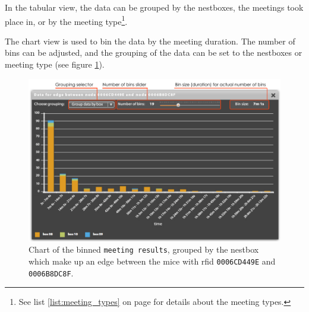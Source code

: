 In the tabular view, the data can be grouped by the nestboxes, the meetings took place in, or by the meeting type\footnote{See list \ref{list:meeting_types} on page \pageref{list:meeting_types} for details about the meeting types.}.

The chart view is used to bin the data by the meeting duration. The number of bins can be adjusted, and the grouping of the data can be set to the nestboxes or meeting type (see figure \ref{fig:edge_data_panel_chart}).

\begin{figure}[!htpb]
\begin{center}
  \includegraphics[width=\textwidth]{assets/pdf/edge_data_panel_chart.pdf}
  \caption[Edge data chart]{Chart of the binned \lstinline|meeting results|, grouped by the nestbox which make up an edge between the mice with rfid \lstinline|0006CD449E| and \lstinline|0006B8DC8F|.}
  \label{fig:edge_data_panel_chart}
\end{center}
\end{figure}   
